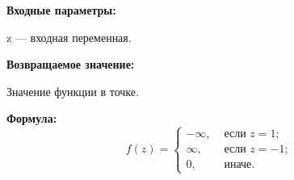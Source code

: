 \textbf{Входные параметры:}
 
z --- входная переменная.

\textbf{Возвращаемое значение:}
 
Значение функции в точке.

\textbf{Формула:}
\begin{equation*}
f\left(z \right)=\left\lbrace \begin{aligned} -\infty,& \text{ если } z = 1 ; \\\infty,& \text{ если } z = -1 ; \\ 0,& \text{ иначе}. \end{aligned}\right.
\end{equation*}